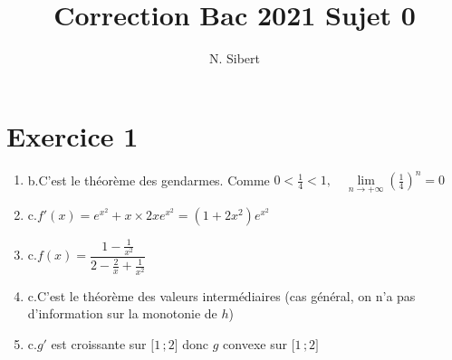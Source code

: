 \documentclass{scrartcl}
\title{Correction Bac 2021 Sujet 0}
\author{N. Sibert}
\begin{document}
    \maketitle

    \section*{Exercice 1}
    \begin{adjustwidth}{2em}{0pt}
        \begin{enumerate}
            \item b.\quad C'est le théorème des gendarmes. Comme $0<\frac{1}{4}<1,\quad\lim\limits_{n\to +\infty}\left(\frac{1}{4}\right)^n=0$
            \item c.\quad $f'(x)=e^{x^2}+x\times 2xe^{x^2}=\left(1+2x^2\right)e^{x^2}$
            \item c.\quad $f(x)=\dfrac{1-\frac{1}{x^2}}{2-\frac{2}{x}+\frac{1}{x^2}}$
            \item c.\quad C'est le théorème des valeurs intermédiaires (cas général, on n'a pas d'information sur la monotonie de $h$)
            \item c.\quad $g'$ est croissante sur $\big[1\,;2\big]$ donc $g$ convexe sur $\big[1\,;2\big]$
        \end{enumerate}
    \end{adjustwidth}
\end{document}
